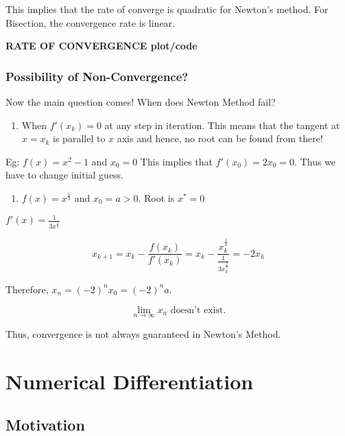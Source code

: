 \documentclass[
]{book}
\providecommand{\tightlist}{%
  \setlength{\itemsep}{0pt}\setlength{\parskip}{0pt}}
\begin{document}
This implies that the rate of converge is quadratic for Newton's method. For Bisection, the convergence rate is linear.

\textbf{RATE OF CONVERGENCE plot/code}

\hypertarget{possibility-of-non-convergence}{%
\subsection{Possibility of Non-Convergence?}\label{possibility-of-non-convergence}}

Now the main question comes! When does Newton Method fail?

\begin{enumerate}
\def\labelenumi{\arabic{enumi}.}
\tightlist
\item
  When \(f'(x_k) = 0\) at any step in iteration. This means that the tangent at \(x=x_k\) is parallel to \(x\) axis and hence, no root can be found from there!
\end{enumerate}

Eg: \(f(x) = x^2-1\) and \(x_0 = 0\) This implies that \(f'(x_0) = 2x_0 = 0\). Thus we have to change initial guess.

\begin{enumerate}
\def\labelenumi{\arabic{enumi}.}
\setcounter{enumi}{1}
\tightlist
\item
  \(f(x) = x^{\frac{1}{3}}\) and \(x_0 = a>0\). Root is \(x^*=0\)
\end{enumerate}

\(f'(x) = \frac{1}{3x^{\frac{2}{3}}}\)

\[x_{k+1}= x_k - \frac{f(x_k)}{f'(x_k)} = x_k - \frac{x_k^{\frac{1}{3}}}{\frac{1}{3x_k^{\frac{2}{3}}}} = -2 x_k\]

Therefore, \(x_n = (-2)^n x_0 = (-2)^n a\).

\[\lim_{n \to \infty} x_n \text{ doesn't exist.}\]

Thus, convergence is not always guaranteed in Newton's Method.

\hypertarget{numerical-differentiation}{%
\chapter{Numerical Differentiation}\label{numerical-differentiation}}

\hypertarget{motivation-4}{%
\section{Motivation}\label{motivation-4}}
\end{document}
